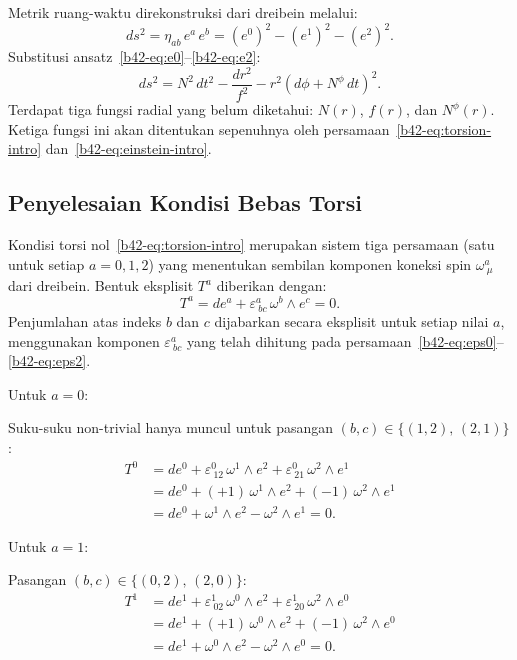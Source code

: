 Metrik ruang-waktu direkonstruksi dari dreibein melalui:
\begin{equation}
    ds^2 = \eta_{ab}\,e^a\,e^b = (e^0)^2 - (e^1)^2 - (e^2)^2.
\end{equation}
Substitusi ansatz~\eqref{b42-eq:e0}--\eqref{b42-eq:e2}:
\begin{equation}
    ds^2 = N^2\,dt^2 - \frac{dr^2}{f^2} - r^2\!\left(d\phi + N^\phi\,dt\right)^2. \label{b42-eq:metric-ansatz}
\end{equation}
Terdapat tiga fungsi radial yang belum diketahui: $N(r)$, $f(r)$, dan $N^\phi(r)$. Ketiga fungsi ini akan ditentukan sepenuhnya oleh persamaan~\eqref{b42-eq:torsion-intro} dan~\eqref{b42-eq:einstein-intro}.
 
\subsection{Penyelesaian Kondisi Bebas Torsi}
\label{b42-sec:torsion}
 
Kondisi torsi nol~\eqref{b42-eq:torsion-intro} merupakan sistem tiga persamaan (satu untuk setiap $a = 0,1,2$) yang menentukan sembilan komponen koneksi spin $\omega^a_{\ \mu}$ dari dreibein. Bentuk eksplisit $T^a$ diberikan dengan:
\begin{equation}
    T^a = de^a + \varepsilon^{a}_{\ bc}\,\omega^b \wedge e^c = 0. \label{b42-eq:torsion-def}
\end{equation}
Penjumlahan atas indeks $b$ dan $c$ dijabarkan secara eksplisit untuk setiap nilai $a$, menggunakan komponen $\varepsilon^{a}_{\ bc}$ yang telah dihitung pada persamaan~\eqref{b42-eq:eps0}--\eqref{b42-eq:eps2}.
 
\noindent Untuk $a = 0$:
 
Suku-suku non-trivial hanya muncul untuk pasangan $(b,c) \in \{(1,2),\,(2,1)\}$:
\begin{align}
    T^0 &= de^0 + \varepsilon^{0}_{\ 12}\,\omega^1 \wedge e^2 + \varepsilon^{0}_{\ 21}\,\omega^2 \wedge e^1 \nonumber\\[4pt]
    &= de^0 + (+1)\,\omega^1 \wedge e^2 + (-1)\,\omega^2 \wedge e^1 \nonumber\\[4pt]
    &= de^0 + \omega^1 \wedge e^2 - \omega^2 \wedge e^1 = 0. \label{b42-eq:T0}
\end{align}
 
\noindent Untuk $a = 1$:
 
Pasangan $(b,c) \in \{(0,2),\,(2,0)\}$:
\begin{align}
    T^1 &= de^1 + \varepsilon^{1}_{\ 02}\,\omega^0 \wedge e^2 + \varepsilon^{1}_{\ 20}\,\omega^2 \wedge e^0 \nonumber\\[4pt]
    &= de^1 + (+1)\,\omega^0 \wedge e^2 + (-1)\,\omega^2 \wedge e^0 \nonumber\\[4pt]
    &= de^1 + \omega^0 \wedge e^2 - \omega^2 \wedge e^0 = 0. \label{b42-eq:T1}
\end{align}
 
